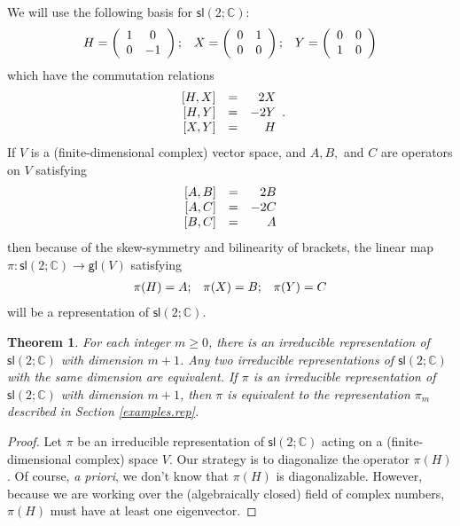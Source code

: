 \documentclass{amsbook}
\theoremstyle{plain}
\newtheorem{theorem}{Theorem}
\numberwithin{equation}{chapter}
\numberwithin{theorem}{chapter}
\begin{document}
We will use the following basis for $\mathsf{sl}(2;\mathbb{C})$:
\[%
\begin{array}
[c]{ccc}%
H=\left(
\begin{array}
[c]{cc}%
1 & 0\\
0 & -1
\end{array}
\right)  ; & X=\left(
\begin{array}
[c]{cc}%
0 & 1\\
0 & 0
\end{array}
\right)  ; & Y=\left(
\begin{array}
[c]{cc}%
0 & 0\\
1 & 0
\end{array}
\right)
\end{array}
\]
which have the commutation relations
\[%
\begin{array}
[c]{rrr}%
\lbrack H,X] & = & 2X\\
\lbrack H,Y] & = & -2Y\\
\lbrack X,Y] & = & H
\end{array}
\text{.}%
\]
If $V$ is a (finite-dimensional complex) vector space, and $A,B,$ and $C$ are
operators on $V$ satisfying
\[%
\begin{array}
[c]{rrr}%
\lbrack A,B] & = & 2B\\
\lbrack A,C] & = & -2C\\
\lbrack B,C] & = & A
\end{array}
\]
then because of the skew-symmetry and bilinearity of brackets, the linear map
$\pi:\mathsf{sl}(2;\mathbb{C})\rightarrow\mathsf{gl}(V)$ satisfying
\[%
\begin{array}
[c]{ccc}%
\pi(H)=A; & \pi(X)=B; & \pi(Y)=C
\end{array}
\]
will be a representation of $\mathsf{sl}(2;\mathbb{C})$.

\begin{theorem}
\label{classify.rep}For each integer $m\geq0$, there is an irreducible
representation of $\mathsf{sl}(2;\mathbb{C})$ with dimension $m+1$. Any two
irreducible representations of $\mathsf{sl}(2;\mathbb{C})$ with the same
dimension are equivalent. If $\pi$ is an irreducible representation of
$\mathsf{sl}(2;\mathbb{C})$ with dimension $m+1$, then $\pi$ is equivalent to
the representation $\pi_{m}$ described in Section \ref{examples.rep}.
\end{theorem}

\begin{proof}
Let $\pi$ be an irreducible representation of $\mathsf{sl}(2;\mathbb{C})$
acting on a (finite-dimensional complex) space $V$. Our strategy is to
diagonalize the operator $\pi(H)$. Of course, \textit{a priori}, we don't know
that $\pi(H)$ is diagonalizable. However, because we are working over the
(algebraically closed) field of complex numbers, $\pi(H)$ must have at least
one eigenvector.
\end{proof}
\end{document}
